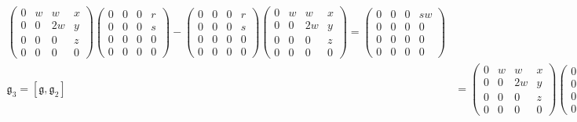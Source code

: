 \documentclass[12pt]{article}
\newcommand{\g}{\mathfrak{g}}
\begin{document}
\begin{align*}
\begin{pmatrix}
                0 & w & w & x\\ 
                0 & 0 & 2w & y\\
                0 & 0 & 0 & z\\
                0 & 0 & 0 & 0
            \end{pmatrix}\begin{pmatrix}
                0 & 0 & 0 & r\\ 
                0 & 0 & 0 & s\\
                0 & 0 & 0 & 0\\
                0 & 0 & 0 & 0
            \end{pmatrix} - \begin{pmatrix}
                0 & 0 & 0 & r\\ 
                0 & 0 & 0 & s\\
                0 & 0 & 0 & 0\\
                0 & 0 & 0 & 0
            \end{pmatrix}\begin{pmatrix}
                0 & w & w & x\\ 
                0 & 0 & 2w & y\\
                0 & 0 & 0 & z\\
                0 & 0 & 0 & 0
            \end{pmatrix} = \begin{pmatrix}
                0 & 0 & 0 & sw\\ 
                0 & 0 & 0 & 0\\
                0 & 0 & 0 & 0\\
                0 & 0 & 0 & 0
            \end{pmatrix}\\ 
            \g_3 = [\g, \g_2] &= \begin{pmatrix}
                0 & w & w & x\\ 
                0 & 0 & 2w & y\\
                0 & 0 & 0 & z\\
                0 & 0 & 0 & 0
            \end{pmatrix}\begin{pmatrix}
                0 & 0 & 0 & sw\\ 
                0 & 0 & 0 & 0\\
                0 & 0 & 0 & 0\\
                0 & 0 & 0 & 0
            \end{pmatrix} - \begin{pmatrix}

\end{pmatrix}
\end{align*}
\end{document}
